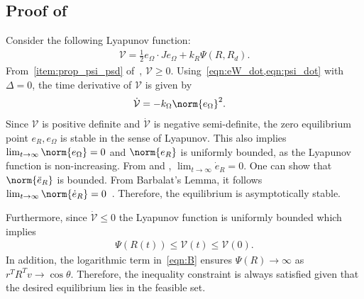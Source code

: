 \subsection{Proof of~}\label{proof:att_control}
Consider the following Lyapunov function:
\begin{gather*}%
	\mathcal{V} = \frac{1}{2} e_\Omega \cdot J e_\Omega + k_R \Psi(R,R_d) . 
\end{gather*}
From~\cref{item:prop_psi_psd} of~, \(\mathcal{V} \geq 0 \).
Using~\cref{eqn:eW_dot,eqn:psi_dot} with \( \Delta = 0 \), the time derivative of \( \mathcal{V} \) is given by
\begin{align*}%
	\dot{\mathcal{V}} &= -k_\Omega \norm{e_\Omega}^2 . 
\end{align*}
Since \( \mathcal{V} \) is positive definite and \( \dot{\mathcal{V}} \) is negative semi-definite, the zero equilibrium point \( e_R, e_\Omega \) is stable in the sense of Lyapunov. 
This also implies \( \lim_{t\to\infty} \norm{e_\Omega} = 0 \) and \( \norm{e_R} \) is uniformly bounded, as the Lyapunov function is non-increasing. From  and , $\lim_{t\to\infty} \dot e_R =0$. 
One can show that \( \norm{\ddot{e}_R} \) is bounded.
From Barbalat's Lemma, it follows \( \lim_{t\to\infty}\norm{\dot{e}_R} = 0 \)~\cite[Lemma 8.2]{khalil1996}. 
Therefore, the equilibrium is asymptotically stable. 
	
Furthermore, since \( \dot{\mathcal{V}} \leq 0 \) the Lyapunov function is uniformly bounded which implies 
\begin{align*}
	\Psi(R(t)) \leq \mathcal{V}(t) \leq \mathcal{V}(0) .
\end{align*}
In addition, the logarithmic term in~\cref{eqn:B} ensures \( \Psi(R) \to \infty \) as \( r^T R^T v \to \cos \theta \).
Therefore, the inequality constraint is always satisfied given that the desired equilibrium lies in the feasible set.
	
